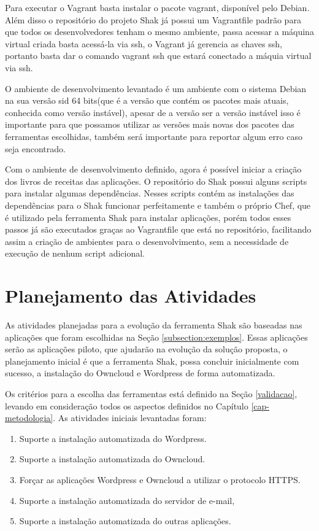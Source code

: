 Para executar o Vagrant basta instalar o pacote vagrant, disponível pelo Debian. Além disso
o repositório do projeto Shak já possui um Vagrantfile padrão para que todos os
desenvolvedores tenham o mesmo ambiente, passa acessar a máquina virtual criada
basta acessá-la via ssh, o Vagrant já gerencia as chaves ssh, portanto basta
dar o comando vagrant ssh que estará conectado a máquia virtual via ssh.

O ambiente de desenvolvimento levantado é um ambiente com o sistema Debian na sua versão
sid 64 bits(que é a versão que contém os pacotes mais atuais, conhecida como versão instável),
apesar de a versão ser a versão instável isso é importante para que possamos
utilizar as versões mais novas dos pacotes das ferramentas escolhidas, também
será importante para reportar algum erro caso seja encontrado.

Com o ambiente de desenvolvimento definido, agora é possível iniciar a criação dos
livros de receitas das aplicações. O repositório do Shak possui alguns scripts
para instalar algumas dependências. Nesses scripts contém as instalações das 
dependências para o Shak funcionar perfeitamente
e também o próprio Chef, que é utilizado pela ferramenta Shak para instalar aplicações, 
porém todos esses passos já são executados graças ao Vagrantfile
que está no repositório, facilitando assim a criação de ambientes para o desenvolvimento,
sem a necessidade de execução de nenhum script adicional.


\section{Planejamento das Atividades}

As atividades planejadas para a evolução da ferramenta Shak são baseadas nas 
aplicações que foram escolhidas na Seção
\ref{subsection:exemplos}. Essas aplicações serão as aplicações piloto, que 
ajudarão na evolução da solução proposta, o planejamento inicial é que a ferramenta 
Shak, possa concluir inicialmente com sucesso, a instalação do Owncloud e Wordpress de forma 
automatizada. 

Os critérios para a escolha das ferramentas está definido na Seção \ref{validacao},
levando em consideração todos os aspectos definidos no Capítulo
\ref{cap-metodologia}. As atividades iniciais levantadas foram:

 \begin{enumerate}
   \item  Suporte a instalação automatizada do Wordpress.
   \item  Suporte a instalação automatizada do Owncloud.
   \item  Forçar as aplicações Wordpress e Owncloud a
   utilizar o protocolo HTTPS.
   \item  Suporte a instalação automatizada do servidor de e-mail,
   \item  Suporte a instalação automatizada do outras aplicações.
 \end{enumerate}

